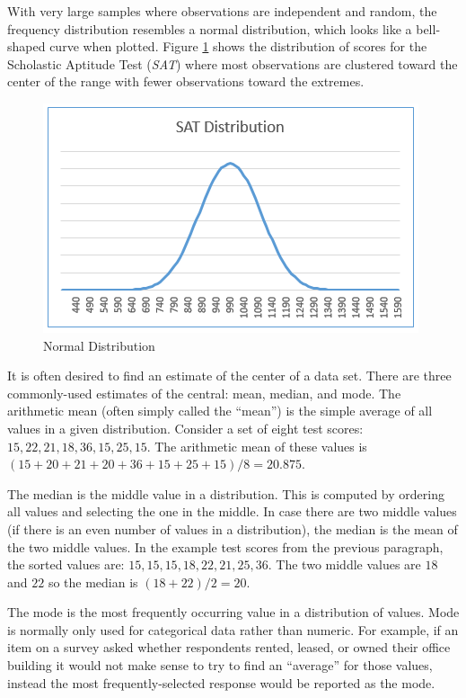 With very large samples where observations are independent and random, the frequency distribution resembles a normal distribution, which looks like a bell-shaped curve when plotted. Figure \ref{14:fig02} shows the distribution of scores for the Scholastic Aptitude Test (\textit{SAT}) where most observations are clustered toward the center of the range with fewer observations toward the extremes. 

\begin{figure}[H]
	\centering
	\includegraphics[width=\maxwidth{.95\linewidth}]{gfx/14-NormDist}
	\caption{Normal Distribution}
	\label{14:fig02}
\end{figure}

It is often desired to find an estimate of the center of a data set. There are three commonly-used estimates of the central: mean, median, and mode. The arithmetic mean (often simply called the ``mean'') is the simple average of all values in a given distribution. Consider a set of eight test scores: $ 15, 22, 21, 18, 36, 15, 25, 15 $. The arithmetic mean of these values is $ (15 + 20 + 21 + 20 + 36 + 15 + 25 + 15)/8 = 20.875 $.

The median is the middle value in a distribution. This is computed by ordering all values and selecting the one in the middle. In case there are two middle values (if there is an even number of values in a distribution), the median is the mean of the two middle values. In the example test scores from the previous paragraph, the sorted values are: $ 15 , 15 , 15 , 18 , 22 , 21, 25, 36 $. The two middle values are $ 18 $ and $ 22 $ so the median is $ (18 + 22)/2 = 20 $. 

The mode is the most frequently occurring value in a distribution of values. Mode is normally only used for categorical data rather than numeric. For example, if an item on a survey asked whether respondents rented, leased, or owned their office building it would not make sense to try to find an ``average'' for those values, instead the most frequently-selected response would be reported as the mode. 

